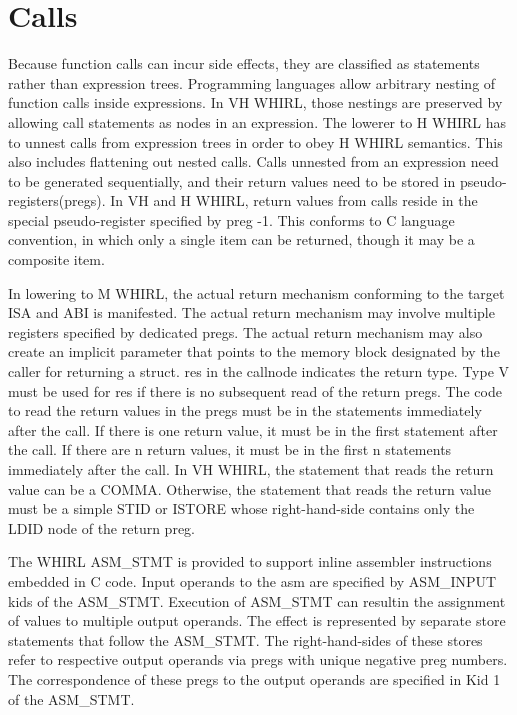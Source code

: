 \documentclass{article}
\begin{document}
\section{Calls}

Because function calls can incur side effects, they are classified
as statements rather than expression trees. Programming languages
allow arbitrary nesting of function calls inside expressions. In
VH WHIRL, those nestings are preserved by allowing call statements
as nodes in an expression. The lowerer to H WHIRL has to unnest
calls from expression trees in order to obey H WHIRL semantics. This
also includes flattening out nested calls. Calls unnested from an
expression need to be generated sequentially, 
and their return values need to be stored in
pseudo-registers(pregs). In VH and H WHIRL, return values from
calls reside in the special pseudo-register specified by preg -1.
This conforms to C language convention, in which only a single item
can be returned, though it may be a composite item.

In lowering to M WHIRL, the actual return mechanism conforming
to the target ISA and ABI is manifested. The actual return mechanism
may involve multiple registers specified by dedicated pregs. The
actual return mechanism may also create an implicit parameter that
points to the memory block designated by the caller for returning
a struct. res in the callnode indicates the return type. Type V
must be used for res if there is no subsequent read of the return
pregs. The code to read the return values in the pregs must be in
the statements immediately after the call. If there is one return
value, it must be in the first statement after the call. If there
are n return values, it must be in the first n statements immediately
after the call. In VH WHIRL, the statement that reads the return
value can be a COMMA. Otherwise, the statement that reads the
return value must be a simple
STID or ISTORE whose right-hand-side contains only the LDID node of
the return preg.

The WHIRL ASM\_STMT is provided to support inline assembler
instructions embedded in C code. Input operands to the asm are
specified by ASM\_INPUT kids of the ASM\_STMT. Execution of ASM\_STMT
can resultin the assignment of values to multiple output operands.
The effect is represented by separate store statements that follow
the ASM\_STMT. The right-hand-sides of these stores refer to respective
output operands via pregs with unique negative preg numbers. The
correspondence of these pregs to the output operands are specified
in Kid 1 of the ASM\_STMT.
\end{document}
